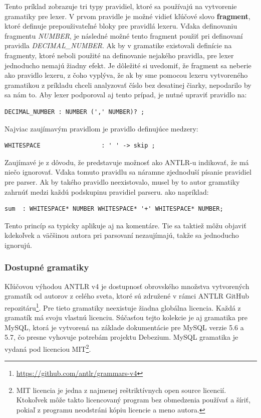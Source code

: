 Tento príklad zobrazuje tri typy pravidiel, ktoré sa používajú na vytvorenie gramatiky pre lexer. V prvom pravidle je možné vidieť kľúčové slovo \textbf{fragment}, ktoré definuje prepouživateľné bloky pre pravidlá lexeru. Vďaka definovaniu fragmentu \textit{NUMBER}, je následné možné tento fragment použiť pri definovaní pravidla \textit{DECIMAL\_NUMBER}. Ak by v gramatike existovali definície na fragmenty, ktoré neboli použité na definovanie nejakého pravidla, pre lexer jednoducho nemajú žiadny efekt. Je dôležité si uvedomiť, že fragment sa neberie ako pravidlo lexeru, z čoho vyplýva, že ak by sme pomocou lexeru vytvoreného gramatikou z príkladu chceli analyzovať číslo bez desatinej čiarky, nepodarilo by sa nám to. Aby lexer podporoval aj tento prípad, je nutné upraviť pravidlo na:

\begin{lstlisting}[basicstyle=\small]
DECIMAL_NUMBER : NUMBER (',' NUMBER)? ;
\end{lstlisting}

Najviac zaujímavým pravidlom je pravidlo definujúce medzery:

\begin{lstlisting}[basicstyle=\small]
WHITESPACE                 : ' ' -> skip ;
\end{lstlisting}

Zaujímavé je z dôvodu, že predstavuje možnosť ako ANTLR-u indikovať, že má niečo ignorovať. Vďaka tomuto pravidlu sa náramne zjednoduší písanie pravidiel pre parser. Ak by takého pravidlo neexistovalo, musel by to autor gramatiky zahrnúť medzi každú podskupinu pravidiel parseru. ako napríklad:
\begin{lstlisting}[basicstyle=\small]
sum  : WHITESPACE* NUMBER WHITESPACE* '+' WHITESPACE* NUMBER;
\end{lstlisting}

Tento princíp sa typicky aplikuje aj na komentáre. Tie sa taktiež môžu objaviť kdekoľvek a väčšinou autora pri parsovaní nezaujímajú, takže sa jednoducho ignorujú.

\subsubsection{Dostupné gramatiky}
Kľúčovou výhodou ANTLR v4 je dostupnosť obrovského množstva vytvorených gramatík od autorov z celého sveta, ktoré sú združené v rámci ANTLR GitHub repozitáru\footnote{\url{https://github.com/antlr/grammars-v4}}. Pre tieto gramatiky neexistuje žiadna globálna licencia. Každá z gramatík má svoju vlastnú licenciu. Súčasťou tejto kolekcie je aj gramatika pre MySQL, ktorá je vytvorená na základe dokumentácie pre MySQL verzie 5.6 a 5.7, čo presne vyhovuje potrebám projektu Debezium. MySQL gramatika je vydaná pod licenciou MIT\footnote{MIT licencia je jedna z najmenej reštriktívnych open source licencií. Ktokoľvek môže takto licencovaný program bez obmedzenia používať a šíriť, pokiaľ z programu neodstráni kópiu licencie a meno autora.}.

